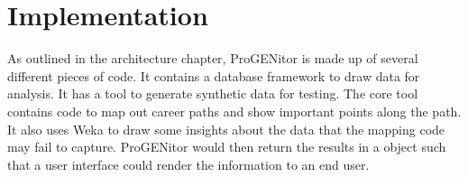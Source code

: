 \chapter{Implementation}
\label{chap:implementation}
As outlined in the architecture chapter, ProGENitor is made up of several
different pieces of code.  It contains a database framework to draw data for
analysis.  It has a tool to generate synthetic data for testing.  The core tool
contains code to map out career paths and show important points along the path. 
It also uses Weka to draw some insights about the data that the mapping code
may fail to capture.  ProGENitor would then return the results in a object
such that a user interface could render the information to an end user.







